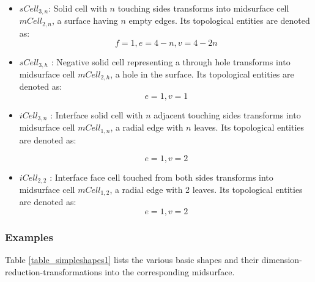 \begin{itemize}
[noitemsep,topsep=2pt,parsep=2pt,partopsep=2pt]

	\item  $sCell_{3,n}$:	Solid cell with $n$ touching sides transforms into midsurface cell   $mCell_{2,n}$, a surface having $n$ empty edges. Its topological entities are denoted as:
\begin{equation}
f=1,
e=4-n,
v=4-2n
\label{eqn_cellularna}
\end{equation} 

	\item   $sCell_{3,h}$ : Negative solid  cell representing a through hole transforms into midsurface cell  $mCell_{2,h}$, a hole in the surface. Its topological entities are denoted as:
\begin{equation}
e=1, v=1
\label{eqn_cellularah}
\end{equation} 

	\item $iCell_{3,n}$ :	Interface solid cell with $n$ adjacent touching sides transforms into midsurface cell  $mCell_{1,n}$, a radial edge with $n$ leaves. Its topological entities are denoted as:

\begin{equation}
e=1,
v=2
\label{eqn_cellulara}
\end{equation}

	\item  $iCell_{2,2}$ :	Interface face cell touched from both sides  transforms into midsurface cell  $mCell_{1,2}$, a radial edge with 2 leaves. Its topological entities are denoted as:
\begin{equation}
e=1,
v=2
\label{eqn_cellularaf}
\end{equation}


\end{itemize}


\subsubsection{Examples}
Table \ref{table_simpleshapes1} lists the various basic shapes and their dimension-reduction-transformations into the corresponding midsurface. 



